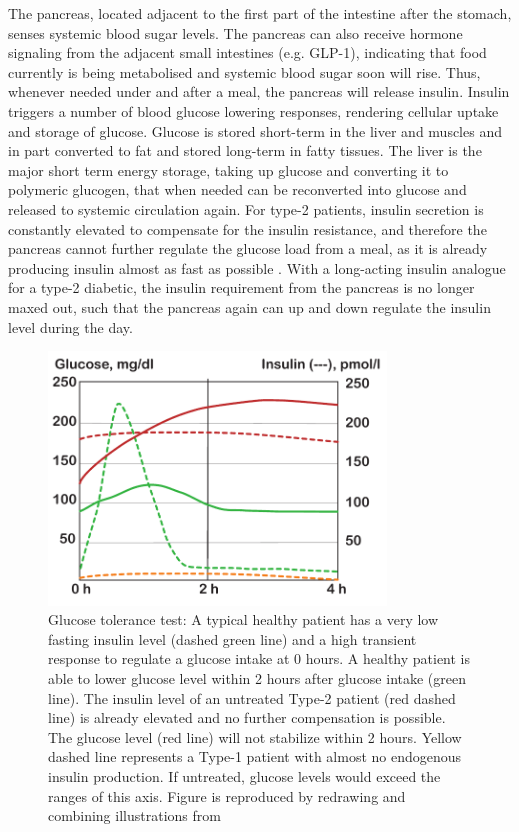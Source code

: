The pancreas, located adjacent to the first part of the intestine after the stomach, senses systemic blood sugar levels. The pancreas can also receive hormone signaling from the adjacent small intestines (e.g. GLP-1), indicating that food currently is being metabolised and systemic blood sugar soon will rise. Thus, whenever needed under and after a meal, the pancreas will release insulin. Insulin triggers a number of blood glucose lowering responses, rendering cellular uptake and storage of glucose. Glucose is stored short-term in the liver and muscles and in part converted to fat and stored long-term in fatty tissues. The liver is the major short term energy storage, taking up glucose and converting it to polymeric glucogen, that when needed can be reconverted into glucose and released to systemic circulation again. For type-2 patients, insulin secretion is constantly elevated to compensate for the insulin resistance, and therefore the pancreas cannot further regulate the glucose load from a meal, as it is already producing insulin almost as fast as possible \cite{silverthorn2010human}. With a long-acting insulin analogue for a type-2 diabetic, the insulin requirement from the pancreas is no longer maxed out, such that the pancreas again can up and down regulate the insulin level during the day.

\begin{figure}[!htbp]
\includegraphics[width=0.8\textwidth,height=0.8\textheight,keepaspectratio]{graphics/glucoseTolerance.pdf}
\caption{Glucose tolerance test: A typical healthy patient has a very low fasting insulin level (dashed green line) and a high transient response to regulate a glucose intake at 0 hours. A healthy patient is able to lower glucose level within 2 hours after glucose intake (green line). The insulin level of an untreated Type-2 patient (red dashed line) is already elevated and no further compensation is possible. The glucose level (red line) will not stabilize within 2 hours. Yellow dashed line represents a Type-1 patient with almost no endogenous insulin production. If untreated, glucose levels would exceed the ranges of this axis. Figure is reproduced by redrawing and combining illustrations from \cite{silverthorn2010human,caumo2004first}}
\label{glucoseTolerance}
\end{figure}


